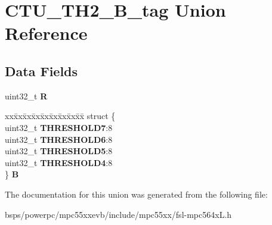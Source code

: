 \hypertarget{unionCTU__TH2__32B__tag}{}\section{C\+T\+U\+\_\+\+T\+H2\+\_\+B\+\_\+tag Union Reference}
\label{unionCTU__TH2__32B__tag}
\subsection*{Data Fields}
\begin{DoxyCompactItemize}
\item 
\mbox{\label{unionCTU__TH2__32B__tag_a09517a683b3dea89c75c5b6613e7d47d}} 
uint32\+\_\+t {\bfseries R}
\item 
\mbox{\label{unionCTU__TH2__32B__tag_a4635d788aaad27b2eb713ca2762109d4}} 
\begin{tabbing}
xx\=xx\=xx\=xx\=xx\=xx\=xx\=xx\=xx\=\kill
struct \{\\
\>uint32\_t {\bfseries THRESHOLD7}:8\\
\>uint32\_t {\bfseries THRESHOLD6}:8\\
\>uint32\_t {\bfseries THRESHOLD5}:8\\
\>uint32\_t {\bfseries THRESHOLD4}:8\\
\} {\bfseries B}\\

\end{tabbing}\end{DoxyCompactItemize}


The documentation for this union was generated from the following file\+:\begin{DoxyCompactItemize}
\item 
bsps/powerpc/mpc55xxevb/include/mpc55xx/fsl-\/mpc564x\+L.\+h\end{DoxyCompactItemize}
